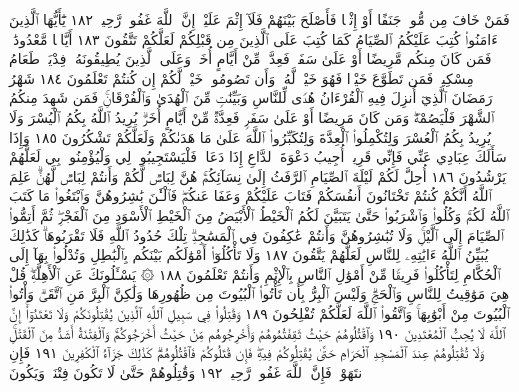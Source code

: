 فَمَنْ خَافَ مِن مُّوصࣲ جَنَفًا أَوْ إِثْمࣰا فَأَصْلَحَ بَيْنَهُمْ فَلَآ إِثْمَ
عَلَيْهِۚ إِنَّ ٱللَّهَ غَفُورࣱ رَّحِيمࣱ ١٨٢ يَٰٓأَيُّهَا ٱلَّذِينَ ءَامَنُوا۟ كُتِبَ
عَلَيْكُمُ ٱلصِّيَامُ كَمَا كُتِبَ عَلَى ٱلَّذِينَ مِن قَبْلِكُمْ
لَعَلَّكُمْ تَتَّقُونَ ١٨٣ أَيَّامࣰا مَّعْدُودَٰتࣲۚ فَمَن كَانَ
مِنكُم مَّرِيضًا أَوْ عَلَىٰ سَفَرࣲ فَعِدَّةࣱ مِّنْ أَيَّامٍ أُخَرَۚ وَعَلَى
ٱلَّذِينَ يُطِيقُونَهُۥ فِدْيَةࣱ طَعَامُ مِسْكِينࣲۖ فَمَن تَطَوَّعَ خَيْرࣰا
فَهُوَ خَيْرࣱ لَّهُۥۚ وَأَن تَصُومُوا۟ خَيْرࣱ لَّكُمْ إِن كُنتُمْ تَعْلَمُونَ ١٨٤
شَهْرُ رَمَضَانَ ٱلَّذِيٓ أُنزِلَ فِيهِ ٱلْقُرْءَانُ هُدࣰى لِّلنَّاسِ
وَبَيِّنَٰتࣲ مِّنَ ٱلْهُدَىٰ وَٱلْفُرْقَانِۚ فَمَن شَهِدَ مِنكُمُ
ٱلشَّهْرَ فَلْيَصُمْهُۖ وَمَن كَانَ مَرِيضًا أَوْ عَلَىٰ سَفَرࣲ فَعِدَّةࣱ
مِّنْ أَيَّامٍ أُخَرَۗ يُرِيدُ ٱللَّهُ بِكُمُ ٱلْيُسْرَ وَلَا يُرِيدُ بِكُمُ
ٱلْعُسْرَ وَلِتُكْمِلُوا۟ ٱلْعِدَّةَ وَلِتُكَبِّرُوا۟ ٱللَّهَ عَلَىٰ مَا
هَدَىٰكُمْ وَلَعَلَّكُمْ تَشْكُرُونَ ١٨٥ وَإِذَا سَأَلَكَ
عِبَادِي عَنِّي فَإِنِّي قَرِيبٌۖ أُجِيبُ دَعْوَةَ ٱلدَّاعِ إِذَا دَعَانِۖ
فَلْيَسْتَجِيبُوا۟ لِي وَلْيُؤْمِنُوا۟ بِي لَعَلَّهُمْ يَرْشُدُونَ ١٨٦
أُحِلَّ لَكُمْ لَيْلَةَ ٱلصِّيَامِ ٱلرَّفَثُ إِلَىٰ نِسَآئِكُمْۚ هُنَّ
لِبَاسࣱ لَّكُمْ وَأَنتُمْ لِبَاسࣱ لَّهُنَّۗ عَلِمَ ٱللَّهُ أَنَّكُمْ كُنتُمْ
تَخْتَانُونَ أَنفُسَكُمْ فَتَابَ عَلَيْكُمْ وَعَفَا عَنكُمْۖ فَٱلْـَٰٔنَ
بَٰشِرُوهُنَّ وَٱبْتَغُوا۟ مَا كَتَبَ ٱللَّهُ لَكُمْۚ وَكُلُوا۟ وَٱشْرَبُوا۟
حَتَّىٰ يَتَبَيَّنَ لَكُمُ ٱلْخَيْطُ ٱلْأَبْيَضُ مِنَ ٱلْخَيْطِ ٱلْأَسْوَدِ مِنَ
ٱلْفَجْرِۖ ثُمَّ أَتِمُّوا۟ ٱلصِّيَامَ إِلَى ٱلَّيْلِۚ وَلَا تُبَٰشِرُوهُنَّ وَأَنتُمْ
عَٰكِفُونَ فِي ٱلْمَسَٰجِدِۗ تِلْكَ حُدُودُ ٱللَّهِ فَلَا تَقْرَبُوهَاۗ كَذَٰلِكَ
يُبَيِّنُ ٱللَّهُ ءَايَٰتِهِۦ لِلنَّاسِ لَعَلَّهُمْ يَتَّقُونَ ١٨٧ وَلَا تَأْكُلُوٓا۟
أَمْوَٰلَكُم بَيْنَكُم بِٱلْبَٰطِلِ وَتُدْلُوا۟ بِهَآ إِلَى ٱلْحُكَّامِ
لِتَأْكُلُوا۟ فَرِيقࣰا مِّنْ أَمْوَٰلِ ٱلنَّاسِ بِٱلْإِثْمِ وَأَنتُمْ تَعْلَمُونَ ١٨٨
۞ يَسْـَٔلُونَكَ عَنِ ٱلْأَهِلَّةِۖ قُلْ هِيَ مَوَٰقِيتُ لِلنَّاسِ وَٱلْحَجِّۗ
وَلَيْسَ ٱلْبِرُّ بِأَن تَأْتُوا۟ ٱلْبُيُوتَ مِن ظُهُورِهَا وَلَٰكِنَّ ٱلْبِرَّ
مَنِ ٱتَّقَىٰۗ وَأْتُوا۟ ٱلْبُيُوتَ مِنْ أَبْوَٰبِهَاۚ وَٱتَّقُوا۟ ٱللَّهَ
لَعَلَّكُمْ تُفْلِحُونَ ١٨٩ وَقَٰتِلُوا۟ فِي سَبِيلِ ٱللَّهِ ٱلَّذِينَ
يُقَٰتِلُونَكُمْ وَلَا تَعْتَدُوٓا۟ۚ إِنَّ ٱللَّهَ لَا يُحِبُّ ٱلْمُعْتَدِينَ ١٩٠
وَٱقْتُلُوهُمْ حَيْثُ ثَقِفْتُمُوهُمْ وَأَخْرِجُوهُم مِّنْ حَيْثُ أَخْرَجُوكُمْۚ وَٱلْفِتْنَةُ
أَشَدُّ مِنَ ٱلْقَتْلِۚ وَلَا تُقَٰتِلُوهُمْ عِندَ ٱلْمَسْجِدِ ٱلْحَرَامِ حَتَّىٰ يُقَٰتِلُوكُمْ
فِيهِۖ فَإِن قَٰتَلُوكُمْ فَٱقْتُلُوهُمْۗ كَذَٰلِكَ جَزَآءُ ٱلْكَٰفِرِينَ ١٩١ فَإِنِ ٱنتَهَوْا۟
فَإِنَّ ٱللَّهَ غَفُورࣱ رَّحِيمࣱ ١٩٢ وَقَٰتِلُوهُمْ حَتَّىٰ لَا تَكُونَ فِتْنَةࣱ وَيَكُونَ
